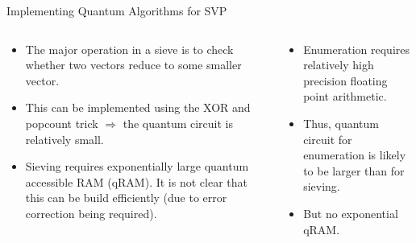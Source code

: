 \documentclass[xcolor=table,10pt,aspectratio=169]{beamer}
\begin{document}
\begin{frame}[label={sec:orga914282}]{Implementing Quantum Algorithms for SVP}
\begin{columns}[t]
\begin{column}{0.5\columnwidth}
\begin{itemize}
\item The major operation in a sieve is to check whether two vectors reduce to some smaller vector.
\item This can be implemented using the XOR and popcount trick \(\Rightarrow\) the quantum circuit is relatively small.
\item Sieving requires exponentially large quantum accessible RAM (qRAM). It is not clear that this can be build efficiently (due to error correction being required).
\end{itemize}
\end{column}

\begin{column}{0.5\columnwidth}
\begin{itemize}
\item Enumeration requires relatively high precision floating point arithmetic.
\item Thus, quantum circuit for enumeration is likely to be larger than for sieving.
\item But no exponential qRAM.
\end{itemize}
\end{column}
\end{columns}
\end{frame}
\end{document}
